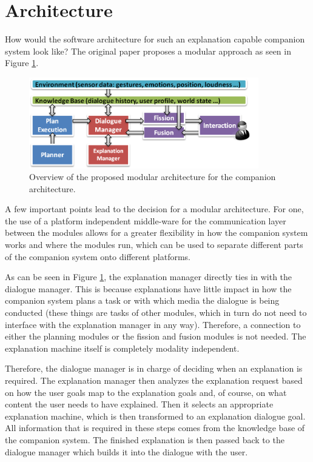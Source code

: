 \documentclass[a4paper]{article}
\begin{document}
\section{Architecture}

How would the software architecture for such an explanation capable companion system look like? The original paper proposes a modular approach as seen in Figure \ref{fig:architecture}.

\begin{figure}[H]
	\centering
	\includegraphics[width=10cm]{arch.png}
	\caption{Overview of the proposed modular architecture for the companion architecture.}
	\label{fig:architecture}
\end{figure}

A few important points lead to the decision for a modular architecture. For one, the use of a platform independent middle-ware for the communication layer between the modules allows for a greater flexibility in how the companion system works and where the modules run, which can be used to separate different parts of the companion system onto different platforms.

As can be seen in Figure \ref{fig:architecture}, the explanation manager directly ties in with the dialogue manager. This is because explanations have little impact in how the companion system plans a task or with which media the dialogue is being conducted (these things are tasks of other modules, which in turn do not need to interface with the explanation manager in any way). Therefore, a connection to either the planning modules or the fission and fusion modules is not needed. The explanation machine itself is completely modality independent.

Therefore, the dialogue manager is in charge of deciding when an explanation is required. The explanation manager then analyzes the explanation request based on how the user goals map to the explanation goals and, of course, on what content the user needs to have explained. Then it selects an appropriate explanation machine, which is then transformed to an explanation dialogue goal. All information that is required in these steps comes from the knowledge base of the companion system. The finished explanation is then passed back to the dialogue manager which builds it into the dialogue with the user.
\end{document}
